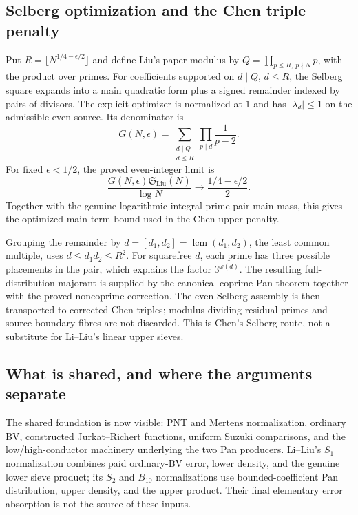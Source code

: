 \subsection{Selberg optimization and the Chen triple penalty}

Put $R=\lfloor N^{1/4-\epsilon/2}\rfloor$ and define Liu's paper modulus by $Q=\prod_{p\le R,\ p\nmid N}p$, with the product over primes.
For coefficients supported on $d\mid Q$, $d\le R$, the Selberg square expands
into a main quadratic form plus a signed remainder indexed by pairs of divisors.
The explicit optimizer is normalized at $1$ and has $|\lambda_d|\le1$
on the admissible even source. Its denominator is
\[
 G(N,\epsilon)=\sum_{\substack{d\mid Q\\d\le R}}
                  \prod_{p\mid d}\frac1{p-2}.
\]
For fixed $\epsilon<1/2$, the proved even-integer limit is
\[
 \frac{G(N,\epsilon)\mathfrak S_{\mathrm{Liu}}(N)}{\log N}
 \longrightarrow \frac{1/4-\epsilon/2}{2}.
\]
Together with the genuine-logarithmic-integral prime-pair main mass, this gives
the optimized main-term bound used in the Chen upper penalty.

Grouping the remainder by $d=[d_1,d_2]=\operatorname{lcm}(d_1,d_2)$,
the least common multiple, uses $d\le d_1d_2\le R^2$.
For squarefree $d$, each prime has three possible placements in the pair,
which explains the factor $3^{\omega(d)}$.
The resulting full-distribution majorant is supplied by the canonical coprime
Pan theorem together with the proved noncoprime correction.
The even Selberg assembly is then transported to corrected Chen triples;
modulus-dividing residual primes and source-boundary fibres are not discarded.
This is Chen's Selberg route, not a substitute for Li--Liu's linear upper sieves.

\subsection{What is shared, and where the arguments separate}

The shared foundation is now visible: PNT and Mertens normalization, ordinary BV,
constructed Jurkat--Richert functions, uniform Suzuki comparisons, and the
low/high-conductor machinery underlying the two Pan producers.
Li--Liu's $S_1$ normalization combines paid ordinary-BV error, lower density,
and the genuine lower sieve product; its $S_2$ and $B_{10}$ normalizations use
bounded-coefficient Pan distribution, upper density, and the upper product.
Their final elementary error absorption is not the source of these inputs.

